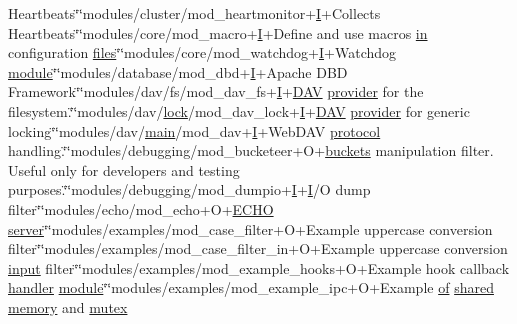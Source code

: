 \begin{DoxyCompactItemize}
Heartbeats\char`\"{}\char`\"{}modules/cluster/mod\+\_\+heartmonitor+\hyperlink{apr__md5_8c_ac0eafdc9ee161b71e7af98af736952fd}{I}+Collects Heartbeats\char`\"{}\char`\"{}modules/core/mod\+\_\+macro+\hyperlink{apr__md5_8c_ac0eafdc9ee161b71e7af98af736952fd}{I}+Define and use macros \hyperlink{group__apr__thread__proc_ga2e46fea00cc2238744ebca5061c62bcc}{in} configuration \hyperlink{pcregrep_8txt_a5aaeef01bce395cfcb41dd64a3bf8607}{files}\char`\"{}\char`\"{}modules/core/mod\+\_\+watchdog+\hyperlink{apr__md5_8c_ac0eafdc9ee161b71e7af98af736952fd}{I}+Watchdog \hyperlink{group__APACHE__CORE__CONFIG_ga0ea4f633a5f9f88e1603aaeb1f2b2e69}{module}\char`\"{}\char`\"{}modules/database/mod\+\_\+dbd+\hyperlink{apr__md5_8c_ac0eafdc9ee161b71e7af98af736952fd}{I}+Apache D\+BD Framework\char`\"{}\char`\"{}modules/dav/fs/mod\+\_\+dav\+\_\+fs+\hyperlink{apr__md5_8c_ac0eafdc9ee161b71e7af98af736952fd}{I}+\hyperlink{group__MOD__DAV_gab3d9c9436d79e6e827e3d828f67f6053}{D\+AV} \hyperlink{group__MOD__DAV_gaf0b2e32aa25087ef77626ce8bb9d7aa4}{provider} for the filesystem.\char`\"{}\char`\"{}modules/dav/\hyperlink{group__APR__Util__RMM_ga0353fe7d0bd33c38d9a7a57a73b6407e}{lock}/mod\+\_\+dav\+\_\+lock+\hyperlink{apr__md5_8c_ac0eafdc9ee161b71e7af98af736952fd}{I}+\hyperlink{group__MOD__DAV_gab3d9c9436d79e6e827e3d828f67f6053}{D\+AV} \hyperlink{group__MOD__DAV_gaf0b2e32aa25087ef77626ce8bb9d7aa4}{provider} for generic locking\char`\"{}\char`\"{}modules/dav/\hyperlink{time-sem_8c_a70db8bd1d499619f7ff9c1ca2ff3c8df}{main}/mod\+\_\+dav+\hyperlink{apr__md5_8c_ac0eafdc9ee161b71e7af98af736952fd}{I}+Web\+D\+AV \hyperlink{group__apr__network__io_gaffe05cd2fe14c30ec8ea72e19680fbda}{protocol} handling.\char`\"{}\char`\"{}modules/debugging/mod\+\_\+bucketeer+O+\hyperlink{group__APACHE__CORE__LISTEN_ga71ecadfdc13a29f11d4afeb94982485b}{buckets} manipulation filter.  Useful only for developers and testing purposes.\char`\"{}\char`\"{}modules/debugging/mod\+\_\+dumpio+\hyperlink{apr__md5_8c_ac0eafdc9ee161b71e7af98af736952fd}{I}+\hyperlink{apr__md5_8c_ac0eafdc9ee161b71e7af98af736952fd}{I}/O dump filter\char`\"{}\char`\"{}modules/echo/mod\+\_\+echo+O+\hyperlink{util__expr__scan_8c_aad1dc60a04a1d8cfc8b3ded13601e361}{E\+C\+HO} \hyperlink{group__APR__Util__RC_ga48a1618bc9e57e0406979ef034512520}{server}\char`\"{}\char`\"{}modules/examples/mod\+\_\+case\+\_\+filter+O+Example uppercase conversion filter\char`\"{}\char`\"{}modules/examples/mod\+\_\+case\+\_\+filter\+\_\+in+O+Example uppercase conversion \hyperlink{perltest_8txt_a1d3f4df61ab6d72e9cfd2de361e2a85b}{input} filter\char`\"{}\char`\"{}modules/examples/mod\+\_\+example\+\_\+hooks+O+Example hook callback \hyperlink{writing-handlers_8txt_a06375414bd03dc9c48eab0f361ada458}{handler} \hyperlink{group__APACHE__CORE__CONFIG_ga0ea4f633a5f9f88e1603aaeb1f2b2e69}{module}\char`\"{}\char`\"{}modules/examples/mod\+\_\+example\+\_\+ipc+O+Example \hyperlink{pcre_8txt_a9d5b55a535a7d176d14b62d664b47b4d}{of} \hyperlink{aplibtool_8c_a99ec2b032d474191fd477772cde15036}{shared} \hyperlink{pcregrep_8txt_a0ba2ddc9ae52fe03fe0eb631f789a85a}{memory} and \hyperlink{group__apr__thread__cond_ga9b5d997217b2ae4c884c535811cb6e35}{mutex} 
\end{DoxyCompactItemize}
